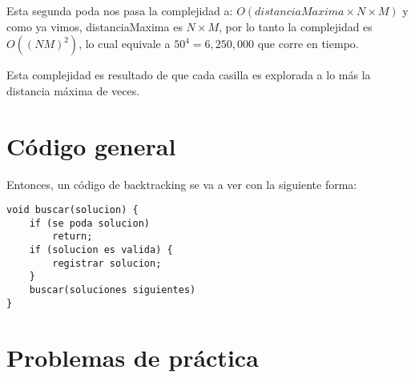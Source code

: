 Esta segunda poda nos pasa la complejidad a: \(O(distanciaMaxima\times N \times M)\) y como ya vimos, distanciaMaxima es \(N\times M\), por lo tanto la complejidad es \(O((NM)^2)\), lo cual equivale a \(50^4=6,250,000\) que corre en tiempo.

Esta complejidad es resultado de que cada casilla es explorada a lo más la distancia máxima de veces.
\pagebreak
\section{Código general}

Entonces, un código de backtracking se va a ver con la siguiente forma:
\begin{lstlisting}
void buscar(solucion) {
	if (se poda solucion)
		return;
	if (solucion es valida) {
		registrar solucion;
	}
	buscar(soluciones siguientes)
}
\end{lstlisting}

\section*{Problemas de práctica}

\begin{exercise}
\end{exercise}
